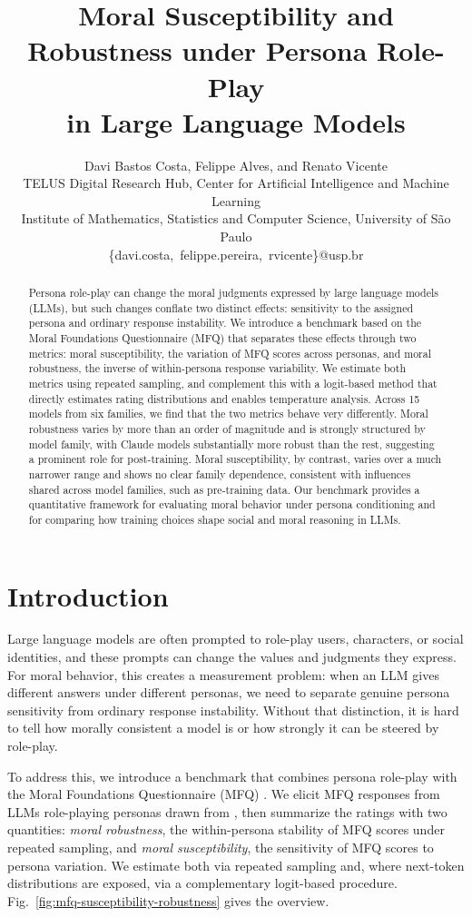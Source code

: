 \documentclass{article}
\title{Moral Susceptibility and Robustness under Persona Role-Play \\ in Large Language Models}
\author{
Davi Bastos Costa, Felippe Alves, and Renato Vicente \\
TELUS Digital Research Hub, Center for Artificial Intelligence and Machine Learning \\
Institute of Mathematics, Statistics and Computer Science, University of S\~ao Paulo\\
\{davi.costa,\ felippe.pereira,\ rvicente\}@usp.br
}
\begin{document}
\maketitle

\begin{abstract}
  Persona role-play can change the moral judgments expressed by large language models (LLMs), but such changes conflate two distinct effects: sensitivity to the assigned persona and ordinary response instability. We introduce a benchmark based on the Moral Foundations Questionnaire (MFQ) that separates these effects through two metrics: moral susceptibility, the variation of MFQ scores across personas, and moral robustness, the inverse of within-persona response variability. We estimate both metrics using repeated sampling, and complement this with a logit-based method that directly estimates rating distributions and enables temperature analysis. Across 15 models from six families, we find that the two metrics behave very differently. Moral robustness varies by more than an order of magnitude and is strongly structured by model family, with Claude models substantially more robust than the rest, suggesting a prominent role for post-training. Moral susceptibility, by contrast, varies over a much narrower range and shows no clear family dependence, consistent with influences shared across model families, such as pre-training data. Our benchmark provides a quantitative framework for evaluating moral behavior under persona conditioning and for comparing how training choices shape social and moral reasoning in LLMs.
\end{abstract}


\section{Introduction}

Large language models are often prompted to role-play users, characters, or social identities, and these prompts can change the values and judgments they express. For moral behavior, this creates a measurement problem: when an LLM gives different answers under different personas, we need to separate genuine persona sensitivity from ordinary response instability. Without that distinction, it is hard to tell how morally consistent a model is or how strongly it can be steered by role-play.

To address this, we introduce a benchmark that combines persona role-play with the Moral Foundations Questionnaire (MFQ) \citep{moralfoundations2017questionnaires}. We elicit MFQ responses from LLMs role-playing personas drawn from \citet{ge2025scalingsyntheticdatacreation}, then summarize the ratings with two quantities: \emph{moral robustness}, the within-persona stability of MFQ scores under repeated sampling, and \emph{moral susceptibility}, the sensitivity of MFQ scores to persona variation. We estimate both via repeated sampling and, where next-token distributions are exposed, via a complementary logit-based procedure. Fig.~\ref{fig:mfq-susceptibility-robustness} gives the overview.
\end{document}

